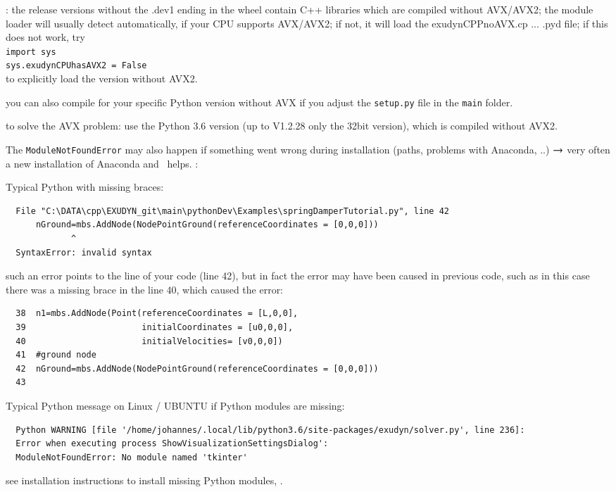 \item[$\ra$] : the release versions without the .dev1 ending in the wheel contain C++ libraries which are compiled without AVX/AVX2; the module loader will usually detect automatically, if your CPU supports AVX/AVX2; if not, it will load the exudynCPPnoAVX.cp ... .pyd file; if this does not work, try\\
\texttt{import sys}\\
\texttt{sys.exudynCPUhasAVX2 = False}\\
to explicitly load the version without AVX2.
\item[$\ra$] you can also compile for your specific Python version without AVX if you adjust the \texttt{setup.py} file in the \texttt{main} folder.
\item[$\ra$]  to solve the AVX problem: use the Python 3.6 version (up to \codeName V1.2.28 only the 32bit version), which is compiled without AVX2.
\item[$\ra$] The \texttt{ModuleNotFoundError} may also happen if something went wrong during installation (paths, problems with Anaconda, ..) $\ra$ very often a new installation of Anaconda and \codeName\ helps.
\ei
\ei
\noindent {}:
\bi
  \item Typical Python  with missing braces:
\plainlststyle
\begin{lstlisting}
  File "C:\DATA\cpp\EXUDYN_git\main\pythonDev\Examples\springDamperTutorial.py", line 42
      nGround=mbs.AddNode(NodePointGround(referenceCoordinates = [0,0,0]))
             ^
  SyntaxError: invalid syntax
\end{lstlisting}
%
\item[$\ra$] such an error points to the line of your code (line 42), but in fact the error may have been caused in previous code, such as in this case there was a missing brace in the line 40, which caused the error:
\pythonstyle\begin{lstlisting}
  38  n1=mbs.AddNode(Point(referenceCoordinates = [L,0,0], 
  39                       initialCoordinates = [u0,0,0], 
  40                       initialVelocities= [v0,0,0])	
  41  #ground node
  42  nGround=mbs.AddNode(NodePointGround(referenceCoordinates = [0,0,0]))
  43  
\end{lstlisting}
%
%
\item Typical Python  message on Linux / UBUNTU if Python modules are missing:
\plainlststyle
\begin{lstlisting}
  Python WARNING [file '/home/johannes/.local/lib/python3.6/site-packages/exudyn/solver.py', line 236]: 
  Error when executing process ShowVisualizationSettingsDialog':
  ModuleNotFoundError: No module named 'tkinter'
\end{lstlisting}
%
\item[$\ra$] see installation instructions to install missing Python modules, .

